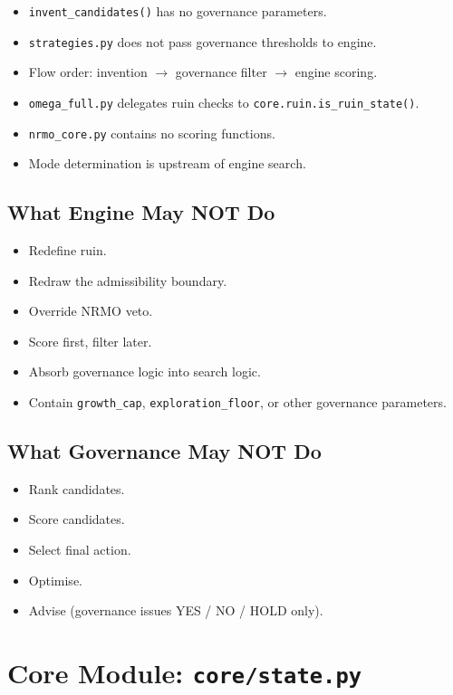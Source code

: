 \begin{itemize}[leftmargin=*]
\item[$\checkmark$] \texttt{invent\_candidates()} has no governance
parameters.
\item[$\checkmark$] \texttt{strategies.py} does not pass governance
thresholds to engine.
\item[$\checkmark$] Flow order: invention $\to$ governance filter
$\to$ engine scoring.
\item[$\checkmark$] \texttt{omega\_full.py} delegates ruin checks
to \texttt{core.ruin.is\_ruin\_state()}.
\item[$\checkmark$] \texttt{nrmo\_core.py} contains no scoring
functions.
\item[$\checkmark$] Mode determination is upstream of engine search.
\end{itemize}

\subsection{What Engine May NOT Do}

\begin{itemize}
\item Redefine ruin.
\item Redraw the admissibility boundary.
\item Override NRMO veto.
\item Score first, filter later.
\item Absorb governance logic into search logic.
\item Contain \texttt{growth\_cap}, \texttt{exploration\_floor},
or other governance parameters.
\end{itemize}

\subsection{What Governance May NOT Do}

\begin{itemize}
\item Rank candidates.
\item Score candidates.
\item Select final action.
\item Optimise.
\item Advise (governance issues YES / NO / HOLD only).
\end{itemize}

\section{Core Module: \texttt{core/state.py}}
\label{sec:impl-core-state}

